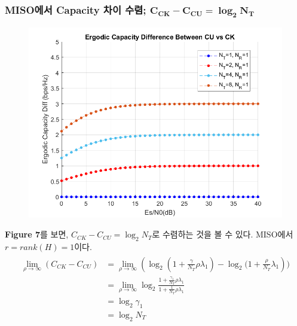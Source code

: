 \documentclass{article}
\newcommand{\bd}{\textbf} %
\begin{document}
\subsubsection{MISO에서 Capacity 차이 수렴; $\boldsymbol{C_{CK}-C_{CU}=\log_2{N_T}}$}
\begin{figure}[H]
	\centering
	\includegraphics[width=.5\textwidth]{ergodic_diff_miso.png}
	\caption{}
\end{figure}
\bd{Figure 7}를 보면, $C_{CK}-C_{CU}=\log_2{N_T}$로 수렴하는 것을 볼 수 있다. MISO에서 $r=rank(H)=1$이다.
\begin{gather}
\begin{split}
\lim_{\rho\rightarrow\infty}(C_{CK}-C_{CU})&=\lim_{\rho\rightarrow\infty}(\log_2{(1+\frac{\gamma}{N_T}\rho\lambda_1)}-\log_2{(1+\frac{\rho}{N_T}\lambda_1}))\\
&=\lim_{\rho\rightarrow\infty}\log_2{\frac{1+\frac{\gamma_1}{N_T}\rho\lambda_1}{1+\frac{1}{N_T}\rho\lambda_1}}\\
&=\log_2{\gamma_1}\\
&=\log_2{N_T}
\end{split}
\end{gather}
\end{document}
